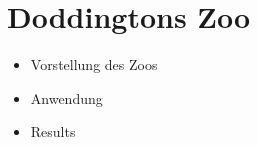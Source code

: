 \section{Doddingtons Zoo}


\begin{itemize}
	\item Vorstellung des Zoos
	\item Anwendung
	\item Results
\end{itemize}